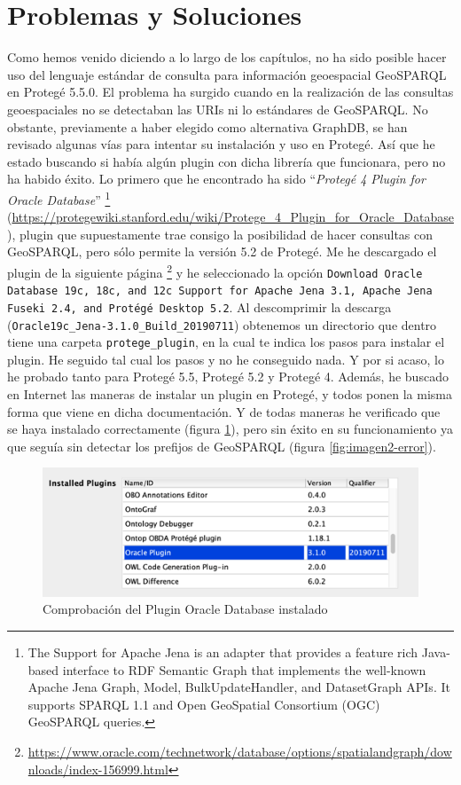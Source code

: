 \section*{Problemas y Soluciones}
\label{ch:ApendiceB}

Como hemos venido diciendo a lo largo de los capítulos, no ha sido posible hacer uso del lenguaje estándar de consulta para información geoespacial GeoSPARQL en Protegé 5.5.0. El problema ha surgido cuando en la realización de las consultas geoespaciales no se detectaban las URIs ni lo estándares de GeoSPARQL. No obstante, previamente a haber elegido como alternativa GraphDB, se han revisado algunas vías para intentar su instalación y uso en Protegé. Así que he estado buscando si había algún plugin con dicha librería que funcionara, pero no ha habido éxito. Lo primero que he encontrado ha sido ``\textit{Protegé 4 Plugin for Oracle Database}'' \footnote{The Support for Apache Jena is an adapter that provides a feature rich Java-based interface to RDF Semantic Graph that implements the well-known Apache Jena Graph, Model, BulkUpdateHandler, and DatasetGraph APIs. It supports SPARQL 1.1 and Open GeoSpatial Consortium (OGC) GeoSPARQL queries.} (\url{https://protegewiki.stanford.edu/wiki/Protege_4_Plugin_for_Oracle_Database}), plugin que supuestamente trae consigo la posibilidad de hacer consultas con GeoSPARQL, pero sólo permite la versión 5.2 de Protegé. Me he descargado el plugin de la siguiente página \footnote{\url{https://www.oracle.com/technetwork/database/options/spatialandgraph/downloads/index-156999.html}} y he seleccionado la opción \texttt{Download Oracle Database 19c, 18c, and 12c Support for Apache Jena 3.1, Apache Jena Fuseki 2.4, and Protégé Desktop 5.2}. Al descomprimir la descarga  (\texttt{Oracle19c\_Jena-3.1.0\_Build\_20190711}) obtenemos un directorio que dentro tiene una carpeta \texttt{protege\_plugin}, en la cual te indica los pasos para instalar el plugin. He seguido tal cual los pasos y no he conseguido nada. Y por si acaso, lo he probado tanto para Protegé 5.5, Protegé 5.2 y Protegé 4. Además, he buscado en Internet las maneras de instalar un plugin en Protegé, y todos ponen la misma forma que viene en dicha documentación. Y de todas maneras he verificado que se haya instalado correctamente (figura \ref{fig:imagen1-comprobar}), pero sin éxito en su funcionamiento ya que seguía sin detectar los prefijos de GeoSPARQL (figura \ref{fig:imagen2-error}).

\begin{figure}[H]
	\centering
	\includegraphics[width=0.7\linewidth]{imagenes/apendices/Imagen1}
	\caption{Comprobación del Plugin Oracle Database instalado}
	\label{fig:imagen1-comprobar}
\end{figure}

